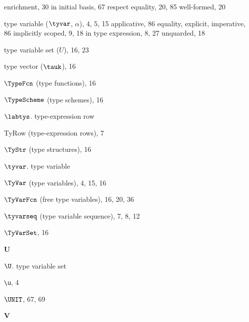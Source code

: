 \begin{theindex}
\subitem enrichment, 30
\subitem in initial basis, 67
\subitem respect equality, 20, 85
\subitem well-formed, 20
\item type variable ($\tyvar$, $\alpha$), 4, 5, 15
\subitem applicative, 86
\subitem equality, \eqtyvarrefs
\subitem explicit, \scopeexpltyvarsrefs
\subitem imperative, 86
\subitem implicitly scoped, 9, 18
\subitem in type expression, 8, 27
\subitem unquarded, 18
\item type variable set ($U$), 16, 23
\item type vector ($\tauk$), 16
\item $\TypeFcn$ (type functions), 16
\item $\TypeScheme$ (type schemes), 16
\item $\labtys$. \see type-expression row
\item TyRow (type-expression rows), 7
\item $\TyStr$ (type structures), 16
\item $\tyvar$.  \see type variable
\item $\TyVar$ (type variables), 4, 15, 16
\item $\TyVarFcn$ (free type variables), 16, 20, 36
\item $\tyvarseq$ (type variable sequence), 7, 8, 12
\item $\TyVarSet$, 16
\indexspace

\parbox{65mm}{\hfil{\large\bf U}\hfil}

\indexspace

\item $\U$. \see type variable set
\item \verb+\u+, 4
\item $\UNIT$, 67, 69
\indexspace

\parbox{65mm}{\hfil{\large\bf V}\hfil}

\indexspace


\end{theindex}
